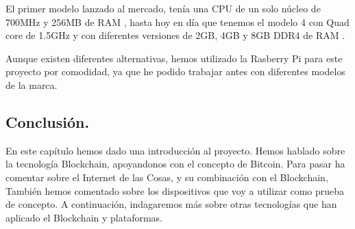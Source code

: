 \vspace{5mm}

\noindent El primer modelo lanzado al mercado, tenía una CPU de un solo núcleo de 700MHz y 256MB de RAM 
\cite{what-is-rasp2}, hasta hoy en día que tenemos el modelo 4 con Quad core de 1.5GHz y con diferentes versiones de 
2GB, 4GB y 8GB DDR4 de RAM \cite{rasp-model-4-specifications}.

\vspace{5mm}

\noindent Aunque existen diferentes alternativas, hemos utilizado la Rasberry Pi para este proyecto por comodidad, ya 
que he podido trabajar antes con diferentes modelos de la marca.

\subsection{Conclusión.}

En este capítulo hemos dado una introducción al proyecto. Hemos hablado sobre la tecnología Blockchain, apoyandonos 
con el concepto de Bitcoin. Para pasar ha comentar sobre el Internet de las Cosas, y su combinación con el Blockchain, 
También hemos comentado sobre los dispositivos que voy a utilizar como prueba de concepto. A continuación, indagaremos 
más sobre otras tecnologías que han aplicado el Blockchain y plataformas.

\newpage